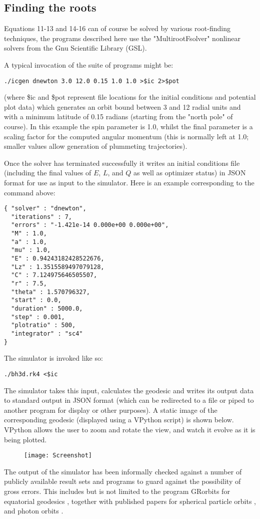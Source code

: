 \documentclass[11pt]{article}
\begin{document}
\subsection{Finding the roots}

Equations 11-13 and 14-16 can of course be solved by various root-finding techniques, the programs described here use the "MultirootFsolver" nonlinear solvers from the Gnu Scientific Library (GSL).

A typical invocation of the suite of programs might be:
\begin{verbatim}
./icgen dnewton 3.0 12.0 0.15 1.0 1.0 >$ic 2>$pot
\end{verbatim}
(where \$ic and \$pot represent file locations for the initial conditions and potential plot data) which generates an orbit bound between 3 and 12 radial units and with a minimum latitude of 0.15 radians (starting from the "north pole" of course).  In this example the spin parameter is 1.0, whilst the final parameter is a scaling factor for the computed angular momentum (this is normally left at 1.0; smaller values allow generation of plummeting trajectories).

Once the solver has terminated successfully it writes an initial conditions file (including the final values of $E$, $L$, and $Q$ as well as optimizer status) in JSON format for use as input to the simulator.  Here is an example corresponding to the command above:
\begin{verbatim}
{ "solver" : "dnewton",
  "iterations" : 7,
  "errors" : "-1.421e-14 0.000e+00 0.000e+00",
  "M" : 1.0,
  "a" : 1.0,
  "mu" : 1.0,
  "E" : 0.94243182428522676,
  "Lz" : 1.3515589497079128,
  "C" : 7.124975646505507,
  "r" : 7.5,
  "theta" : 1.570796327,
  "start" : 0.0,
  "duration" : 5000.0,
  "step" : 0.001,
  "plotratio" : 500,
  "integrator" : "sc4"
}
\end{verbatim}
The simulator is invoked like so:
\begin{verbatim}
./bh3d.rk4 <$ic
\end{verbatim}
The simulator takes this input, calculates the geodesic and writes its output data to standard output in JSON format (which can be redirected to a file or piped to another program for display or other purposes).  A static image of the corresponding geodesic (displayed using a VPython script) is shown below.  VPython allows the user to zoom and rotate the view, and watch it evolve as it is being plotted.
\begin{figure}[h]
\texttt{[image: Screenshot]}
\end{figure}
The output of the simulator has been informally checked against a number of publicly available result sets and programs to guard against the possibility of gross errors.  This includes  but is not limited to the program GRorbits for equatorial geodesics \cite{grorbits}, together with published papers for spherical particle orbits \cite{teo}, and photon orbits \cite{kheng}.
\end{document}
